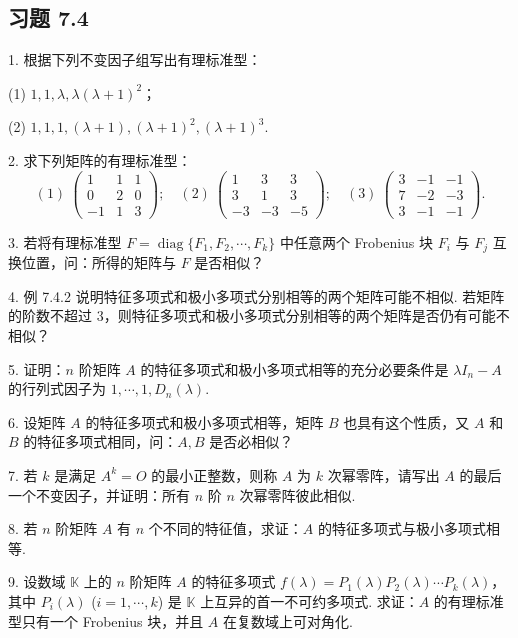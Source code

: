 \documentclass[UTF8,12pt,a4paper,fontset=fandol]{ctexart}
\begin{document}
\subsection*{习题 7.4}

1. 根据下列不变因子组写出有理标准型：

(1) $1,1,\lambda,\lambda(\lambda+1)^2$；

(2) $1,1,1,(\lambda+1),(\lambda+1)^2,(\lambda+1)^3$.

2. 求下列矩阵的有理标准型：
\[
(1)\ \left(\begin{array}{ccc}
1 & 1 & 1\\
0 & 2 & 0\\
-1 & 1 & 3
\end{array}\right);\quad
(2)\ \left(\begin{array}{ccc}
1 & 3 & 3\\
3 & 1 & 3\\
-3 & -3 & -5
\end{array}\right);\quad
(3)\ \left(\begin{array}{ccc}
3 & -1 & -1\\
7 & -2 & -3\\
3 & -1 & -1
\end{array}\right).
\]

3. 若将有理标准型 $F=\operatorname{diag}\{F_1,F_2,\cdots,F_k\}$ 中任意两个 Frobenius 块 $F_i$ 与 $F_j$ 互换位置，问：所得的矩阵与 $F$ 是否相似？

4. 例 7.4.2 说明特征多项式和极小多项式分别相等的两个矩阵可能不相似. 若矩阵的阶数不超过 3，则特征多项式和极小多项式分别相等的两个矩阵是否仍有可能不相似？

5. 证明：$n$ 阶矩阵 $A$ 的特征多项式和极小多项式相等的充分必要条件是 $\lambda I_n-A$ 的行列式因子为 $1,\cdots,1,D_n(\lambda)$.

6. 设矩阵 $A$ 的特征多项式和极小多项式相等，矩阵 $B$ 也具有这个性质，又 $A$ 和 $B$ 的特征多项式相同，问：$A,B$ 是否必相似？

7. 若 $k$ 是满足 $A^k=O$ 的最小正整数，则称 $A$ 为 $k$ 次幂零阵，请写出 $A$ 的最后一个不变因子，并证明：所有 $n$ 阶 $n$ 次幂零阵彼此相似.

8. 若 $n$ 阶矩阵 $A$ 有 $n$ 个不同的特征值，求证：$A$ 的特征多项式与极小多项式相等.

9. 设数域 $\mathbb{K}$ 上的 $n$ 阶矩阵 $A$ 的特征多项式 $f(\lambda)=P_1(\lambda)P_2(\lambda)\cdots P_k(\lambda)$，其中 $P_i(\lambda)$ ($i=1,\cdots,k$) 是 $\mathbb{K}$ 上互异的首一不可约多项式. 求证：$A$ 的有理标准型只有一个 Frobenius 块，并且 $A$ 在复数域上可对角化.
\end{document}
